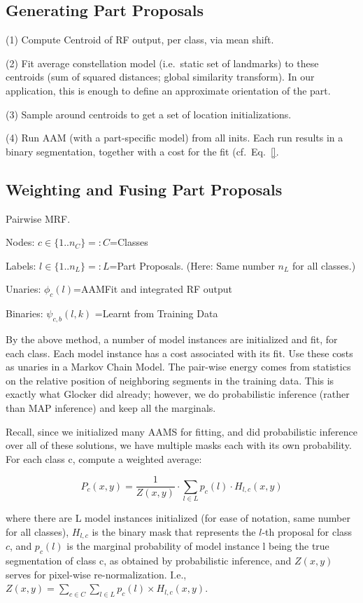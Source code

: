 \documentclass[10pt,twocolumn,letterpaper]{article}
\begin{document}
\subsection{Generating Part Proposals}
\label{subsec:hyps}

(1) Compute Centroid of RF output, per class, via mean shift. 

(2) Fit average constellation model (i.e.\ static set of landmarks) to these centroids (sum of squared distances; global similarity transform). In our application, this is enough to define an approximate orientation of the part. 

(3) Sample around centroids to get a set of location initializations. 

(4) Run AAM (with a part-specific model) from all inits. Each run results in a binary segmentation, together with a cost for the fit (cf.\ Eq.\ \eqref{}. 

\subsection{Weighting and Fusing Part Proposals}
\label{subsec:weightsAndFusion}

Pairwise MRF.

Nodes: $c\in \{1..n_C\}=:C$=Classes

Labels: $l\in \{1..n_L\}=:L$=Part Proposals. (Here: Same number $n_L$ for all classes.)

Unaries: $\phi_c(l)$=AAMFit and integrated RF output

Binaries: $\psi_{c,b}(l,k)$ =Learnt from Training Data

By the above method, a number of model instances are initialized and fit, for each class.  Each model instance has a cost associated with its fit.  Use these costs as unaries in a Markov Chain Model.  The pair-wise energy comes from statistics on the relative position of neighboring segments in the training data.  This is exactly what Glocker did already; however, we do probabilistic inference (rather than MAP inference) and keep all the marginals.

Recall, since we initialized many AAMS for fitting, and did probabilistic inference over all of these solutions, we have multiple masks each with its own probability.  For each class c, compute a weighted average:

\[ P_c(x,y) = \frac{1}{Z(x,y)} \cdot \sum_{l\in L} p_c(l)\cdot H_{l,c}(x,y) \]

where there are L model instances initialized (for ease of notation, same number for all classes), $H_{l,c}$ is the binary mask that represents the $l$-th proposal for class $c$, and $p_c(l)$ is the marginal probability of model instance l being the true segmentation of class c, as obtained by probabilistic inference, and $Z(x,y)$ serves for pixel-wise re-normalization. I.e., $Z(x,y)=\sum_{c\in C}\sum_{l\in L} p_c(l)\times H_{l,c}(x,y)$.
\end{document}
